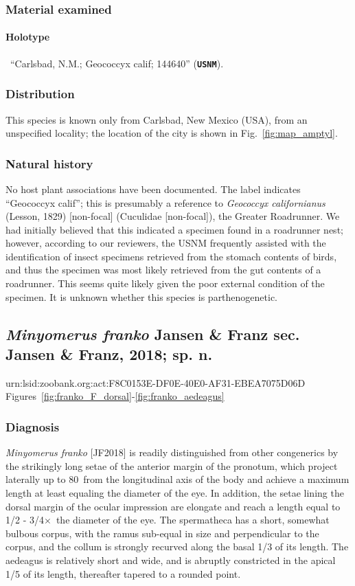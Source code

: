 \documentclass[fleqn,10pt,lineno]{wlpeerj} %
\newcommand{\td}{\textdegree~}
\newcommand{\x}{$\times$~}
\begin{document}
		\subsubsection*{Material examined}
			\paragraph{Holotype}
				\female~``Carlsbad, N.M.; Geococcyx calif; 144640'' (\texttt{\textbf{USNM}}).
		\subsubsection*{Distribution}
			This species is known only from Carlsbad, New Mexico (USA), from an unspecified locality; the location of the city is shown in Fig.~\ref{fig:map_amptyl}.
		\subsubsection*{Natural history}
			No host plant associations have been documented.
			The label indicates ``Geococcyx calif''; this is presumably a reference to \textit{Geococcyx californianus} (Lesson, 1829) [non-focal] (Cuculidae [non-focal]), the Greater Roadrunner. We had initially believed that this indicated a specimen found in a roadrunner nest; however, according to our reviewers, the USNM frequently assisted with the identification of insect specimens retrieved from the stomach contents of birds, and thus the specimen was most likely retrieved from the gut contents of a roadrunner. This seems quite likely given the poor external condition of the specimen.
			It is unknown whether this species is parthenogenetic.
			
	\subsection*{\textit{Minyomerus franko} Jansen \& Franz sec. Jansen \& Franz, 2018; sp. n.}\label{ssec:franko}
		urn:lsid:zoobank.org:act:F8C0153E-DF0E-40E0-AF31-EBEA7075D06D\\
		Figures~\ref{fig:franko_F_dorsal}-\ref{fig:franko_aedeagus}
		\subsubsection*{Diagnosis}
			\textit{Minyomerus franko} [JF2018] is readily distinguished from other congenerics by the strikingly long setae of the anterior margin of the pronotum, which project laterally up to 80\td from the longitudinal axis of the body and achieve a maximum length at least equaling the diameter of the eye.
			In addition, the setae lining the dorsal margin of the ocular impression are elongate and reach a length equal to 1/2 - 3/4\x the diameter of the eye.
			The spermatheca has a short, somewhat bulbous corpus, with the ramus sub-equal in size and perpendicular to the corpus, and the collum is strongly recurved along the basal 1/3 of its length.
			The aedeagus is relatively short and wide, and is abruptly constricted in the apical 1/5 of its length, thereafter tapered to a rounded point.
\end{document}
